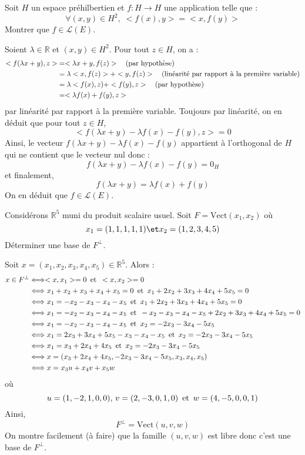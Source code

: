 \documentclass[a4paper,10pt]{report}
\begin{document}
\begin{Exercice}{} Soit $H$ un espace préhilbertien et $f : H \rightarrow H$ une application telle que :
$$ \forall (x,y) \in H^2, \; <f(x),y>=<x,f(y)>$$
Montrer que $f \in \mathcal{L}(E)$.
\end{Exercice} 

\corr Soient $\lambda \in \mathbb{R}$ et $(x,y) \in H^2$. Pour tout $z \in H$, on a :
\begin{align*}
<f(\lambda x +y),z> & = <\lambda x+y, f(z)> \quad \hbox{(par hypothèse)} \\
& = \lambda <x,f(z)> + <y,f(z)> \quad \hbox{(linéarité par rapport à la première variable)} \\
& = \lambda <f(x),z) + <f(y),z>  \quad \hbox{(par hypothèse)} \\
& = <\lambda f(x)+f(y), z> 
\end{align*}
par linéarité par rapport à la première variable. Toujours par linéarité, on en déduit que pour tout $z \in H$,
$$ <f(\lambda x +y)-\lambda f(x)-f(y), z> =0$$
Ainsi, le vecteur $f(\lambda x +y)-\lambda f(x)-f(y)$ appartient à l'orthogonal de $H$ qui ne contient que le vecteur nul donc :
$$ f(\lambda x +y)-\lambda f(x)-f(y) = 0_H$$
et finalement,
$$ f(\lambda x +y)= \lambda f(x)+f(y)$$
On en déduit que $f \in \mathcal{L}(E)$.

\begin{Exercice}{} Considérons $\mathbb{R}^5$ muni du produit scalaire usuel. Soit $F= \textrm{Vect}(x_1,x_2)$ où
$$ x_1 = (1,1,1,1,1) \et x_2 = (1,2,3,4,5)$$
Déterminer une base de $F^{\perp}$.
\end{Exercice} 

\corr Soit $x= (x_1,x_2,x_3,x_4,x_5) \in \mathbb{R}^5$. Alors :
\begin{align*}
x \in F^{\perp} & \Longleftrightarrow <x,x_1>=0 \, \hbox{ et } \,  <x,x_2>=0 \\
& \Longleftrightarrow x_1+x_2+x_3+x_4+x_5=0 \, \hbox{ et } \, x_1+2x_2+3x_3+4x_4+5x_5=0 \\
& \Longleftrightarrow x_1=-x_2-x_3-x_4-x_5 \, \hbox{ et } \, x_1+2x_2+3x_3+4x_4+5x_5=0 \\
& \Longleftrightarrow x_1=-x_2-x_3-x_4-x_5 \, \hbox{ et } \, -x_2-x_3-x_4-x_5+2x_2+3x_3+4x_4+5x_5=0 \\
&  \Longleftrightarrow x_1=-x_2-x_3-x_4-x_5 \, \hbox{ et } \, x_2=-2x_3-3x_4-5x_5 \\
&  \Longleftrightarrow x_1=2x_3+3x_4+5x_5-x_3-x_4-x_5 \, \hbox{ et } \, x_2=-2x_3-3x_4-5x_5 \\
&  \Longleftrightarrow x_1=x_3+2x_4+4x_5 \, \hbox{ et } \, x_2=-2x_3-3x_4-5x_5 \\
& \Longleftrightarrow x= (x_3+2x_4+4x_5, -2x_3-3x_4-5x_5,x_3,x_4,x_5) \\
& \Longleftrightarrow x= x_3 u+x_4 v+ x_5w
\end{align*}
où
$$ u=(1,-2,1,0,0), \, v =(2,-3,0,1,0) \, \hbox{ et } \, w=(4,-5,0,0,1)$$
Ainsi,
$$ F^{\perp} = \textrm{Vect}(u,v,w)$$
On montre facilement (à faire) que la famille $(u,v,w)$ est libre donc c'est une base de $F^{\perp}$.
\end{document}

